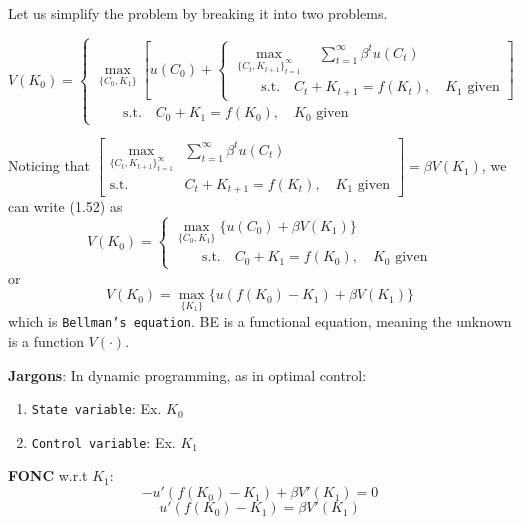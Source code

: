 \documentclass[twoside]{article}
\begin{document}
Let us simplify the problem by breaking it into two problems.

\begin{equation}
  V(K_0) = \begin{cases}
    \max\limits_{\{C_0, K_1\}} 
    \left [ u(C_0) + 
      \begin{cases}
        \max\limits_{\{C_t, K_{t+1}\}_{t=1}^\infty} \quad \sum_{t=1}^\infty \beta^t u(C_t)\\
        \qquad \text{s.t.} \quad C_t + K_{t+1} = f(K_t), \quad K_1  \text{~given}
      \end{cases}
    \right ] \\
    \qquad \text{s.t.} \quad C_0 + K_{1} = f(K_0), \quad K_0  \text{~given}
  \end{cases}
\end{equation}

Noticing that $ \begin{bmatrix}
        \max\limits_{\{C_t, K_{t+1}\}_{t=1}^\infty} & \sum_{t=1}^\infty \beta^t u(C_t)\\
        \text{s.t.} & C_t + K_{t+1} = f(K_t), \quad K_1  \text{~given}
      \end{bmatrix} = \beta V(K_1)$, we can write (1.52) as
\begin{equation}
  V(K_0) = \begin{cases}
    \max\limits_{\{C_0, K_1\}} 
    \Big \{ u(C_0) + 
      \beta V(K_1)
    \Big \} \\
    \qquad \text{s.t.} \quad C_0 + K_{1} = f(K_0), \quad K_0  \text{~given}
  \end{cases}
\end{equation}
or 
\begin{equation}
  V(K_0) = \max\limits_{\{K_1\}} \Big \{ u(f(K_0) - K_{1}) + \beta V(K_1) \Big \}
\end{equation}
which is \texttt{Bellman's equation}. BE is a functional equation, meaning the unknown is a function $V(\cdot)$.

{\bf Jargons}: In dynamic programming, as in optimal control:
\begin{enumerate}
  \item \texttt{State variable}: Ex. $K_0$
  \item \texttt{Control variable}: Ex. $K_1$
\end{enumerate}

\textbf{FONC} w.r.t $K_1$:
\begin{equation}
  - u'(f(K_0)-K_1) + \beta V'(K_1) = 0 
\end{equation}
\begin{equation}
  u'(f(K_0)-K_1) = \beta V'(K_1)
\end{equation}
\end{document}
